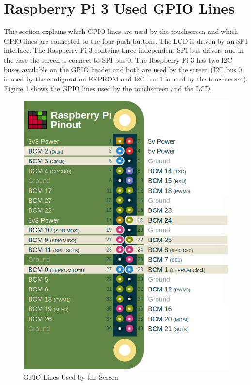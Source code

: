 \documentclass{article}
\begin{document}
\section{Raspberry Pi 3 Used GPIO Lines}

This section explains which GPIO lines are used by the touchscreen and which GPIO lines are connected to the four push-buttons. The LCD is driven by an SPI interface. The Raspberry Pi 3 contains three independent SPI bus drivers and in the case the screen is connect to SPI bus 0. The Raspberry Pi 3 has two I2C buses available on the GPIO header and both are used by the screen (I2C bus 0 is used by the configuration EEPROM and I2C bus 1 is used by the touchscreen). Figure \ref{Screen_Used_GPIO} shows the GPIO lines used by the touchscreen and the LCD.

	\begin{figure}[H]
		\centering
		\includegraphics[scale=0.3]{pics/GPIO_Used_By_Screen.png}
		\caption{GPIO Lines Used by the Screen}
		\label{Screen_Used_GPIO}
	\end{figure} 
\end{document}
